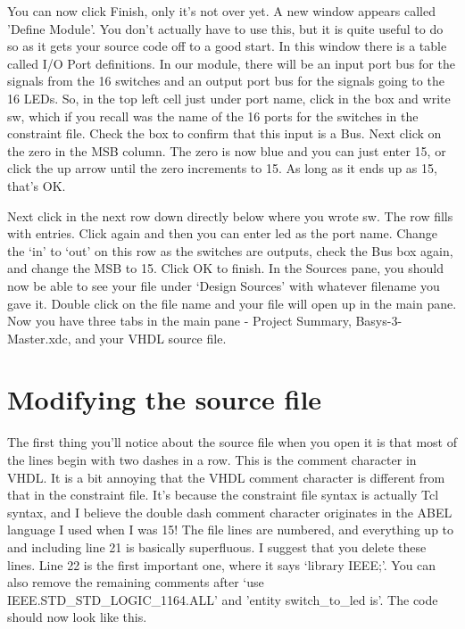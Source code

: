 \documentclass[../physical_computing.tex]{subfiles}
\begin{document}
You can now click Finish, only it's not over yet. A new window appears called 'Define Module'. You don't actually have to use this, but it is quite useful to do so as it gets your source code off to a good start. In this window there is a table called I/O Port definitions. In our module, there will be an input port bus for the signals from the 16 switches and an output port bus for the signals going to the 16 LEDs. So, in the top left cell just under port name, click in the box and write sw, which if you recall was the name of the 16 ports for the switches in the constraint file. Check the box to confirm that this input is a Bus. Next click on the zero in the MSB column. The zero is now blue and you can just enter 15, or click the up arrow until the zero increments to 15. As long as it ends up as 15, that's OK. 

Next click in the next row down directly below where you wrote sw. The row fills with entries. Click again and then you can enter led as the port name. Change the `in' to `out' on this row as the switches are outputs, check the Bus box again, and change the MSB to 15. Click OK to finish. In the Sources pane, you should now be able to see your file under `Design Sources' with whatever filename you gave it. Double click on the file name and your file will open up in the main pane. Now you have three tabs in the main pane - Project Summary, Basys-3-Master.xdc, and your VHDL source file.

\section{Modifying the source file}
\label{sec:source_file_mods}

The first thing you'll notice about the source file when you open it is that most of the lines begin with two dashes in a row. This is the comment character in VHDL. It is a bit annoying that the VHDL comment character is different from that in the constraint file. It's because the constraint file syntax is actually Tcl syntax, and I believe the double dash comment character originates in the ABEL language I used when I was 15! The file lines are numbered, and everything up to and including line 21 is basically superfluous. I suggest that you delete these lines. Line 22 is the first important one, where it says `library IEEE;'. You can also remove the remaining comments after `use IEEE.STD\_STD\_LOGIC\_1164.ALL' and 'entity switch\_to\_led is'. The code should now look like this.

\newpage
\end{document}
